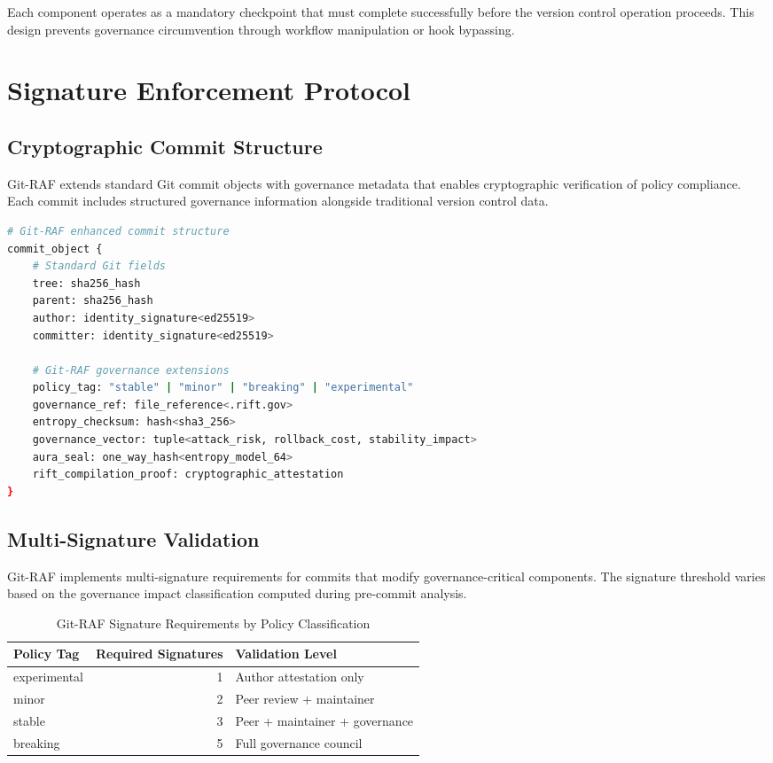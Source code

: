 Each component operates as a mandatory checkpoint that must complete successfully before the version control operation proceeds. This design prevents governance circumvention through workflow manipulation or hook bypassing.

\section{Signature Enforcement Protocol}

\subsection{Cryptographic Commit Structure}

Git-RAF extends standard Git commit objects with governance metadata that enables cryptographic verification of policy compliance. Each commit includes structured governance information alongside traditional version control data.

\begin{lstlisting}[style=riftlang, language=bash]
# Git-RAF enhanced commit structure
commit_object {
    # Standard Git fields
    tree: sha256_hash
    parent: sha256_hash  
    author: identity_signature<ed25519>
    committer: identity_signature<ed25519>
    
    # Git-RAF governance extensions
    policy_tag: "stable" | "minor" | "breaking" | "experimental"
    governance_ref: file_reference<.rift.gov>
    entropy_checksum: hash<sha3_256>
    governance_vector: tuple<attack_risk, rollback_cost, stability_impact>
    aura_seal: one_way_hash<entropy_model_64>
    rift_compilation_proof: cryptographic_attestation
}
\end{lstlisting}

\subsection{Multi-Signature Validation}

Git-RAF implements multi-signature requirements for commits that modify governance-critical components. The signature threshold varies based on the governance impact classification computed during pre-commit analysis.

\begin{table}[h]
\centering
\begin{tabular}{|l|r|l|}
\hline
\textbf{Policy Tag} & \textbf{Required Signatures} & \textbf{Validation Level} \\
\hline
experimental & 1 & Author attestation only \\
minor & 2 & Peer review + maintainer \\
stable & 3 & Peer + maintainer + governance \\
breaking & 5 & Full governance council \\
\hline
\end{tabular}
\caption{Git-RAF Signature Requirements by Policy Classification}
\label{tab:signature_requirements}
\end{table}

